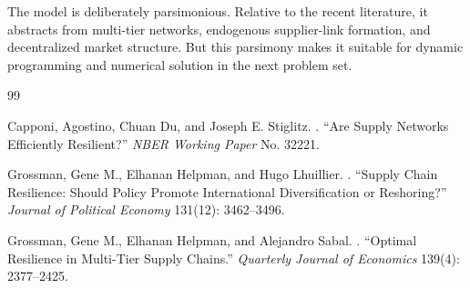 \documentclass[11pt]{article}
\begin{document}
The model is deliberately parsimonious. Relative to the recent literature, it abstracts from multi-tier networks, endogenous supplier-link formation, and decentralized market structure. But this parsimony makes it suitable for dynamic programming and numerical solution in the next problem set.

\begin{thebibliography}{99}

Capponi, Agostino, Chuan Du, and Joseph E. Stiglitz.
.
\newblock ``Are Supply Networks Efficiently Resilient?''
\newblock \emph{NBER Working Paper} No. 32221.

Grossman, Gene M., Elhanan Helpman, and Hugo Lhuillier.
.
\newblock ``Supply Chain Resilience: Should Policy Promote International Diversification or Reshoring?''
\newblock \emph{Journal of Political Economy} 131(12): 3462--3496.

Grossman, Gene M., Elhanan Helpman, and Alejandro Sabal.
.
\newblock ``Optimal Resilience in Multi-Tier Supply Chains.''
\newblock \emph{Quarterly Journal of Economics} 139(4): 2377--2425.

\end{thebibliography}
\end{document}

